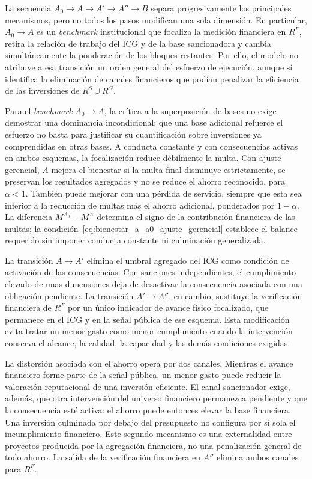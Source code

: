 La secuencia \(A_0\to A\to A'\to A''\to B\) separa progresivamente los principales mecanismos, pero no todos los pasos modifican una sola dimensión. En particular, \(A_0\to A\) es un \textit{benchmark} institucional que focaliza la medición financiera en \(R^{F}\), retira la relación de trabajo del ICG y de la base sancionadora y cambia simultáneamente la ponderación de los bloques restantes. Por ello, el modelo no atribuye a esa transición un orden general del esfuerzo de ejecución, aunque sí identifica la eliminación de canales financieros que podían penalizar la eficiencia de las inversiones de \(R^{S}\cup R^{G}\).

Para el \textit{benchmark} \(A_0\to A\), la crítica a la superposición de bases no exige demostrar una dominancia incondicional: que una base adicional refuerce el esfuerzo no basta para justificar su cuantificación sobre inversiones ya comprendidas en otras bases. A conducta constante y con consecuencias activas en ambos esquemas, la focalización reduce débilmente la multa. Con ajuste gerencial, \(A\) mejora el bienestar si la multa final disminuye estrictamente, se preservan los resultados agregados y no se reduce el ahorro reconocido, para \(\alpha<1\). También puede mejorar con una pérdida de servicio, siempre que esta sea inferior a la reducción de multas más el ahorro adicional, ponderados por \(1-\alpha\). La diferencia \(M^{A_0}-M^A\) determina el signo de la contribución financiera de las multas; la condición~\eqref{eq:bienestar_a_a0_ajuste_gerencial} establece el balance requerido sin imponer conducta constante ni culminación generalizada.

La transición \(A\to A'\) elimina el umbral agregado del ICG como condición de activación de las consecuencias. Con sanciones independientes, el cumplimiento elevado de unas dimensiones deja de desactivar la consecuencia asociada con una obligación pendiente. La transición \(A'\to A''\), en cambio, sustituye la verificación financiera de \(R^{F}\) por un único indicador de avance físico focalizado, que permanece en el ICG y en la señal pública de ese esquema. Esta modificación evita tratar un menor gasto como menor cumplimiento cuando la intervención conserva el alcance, la calidad, la capacidad y las demás condiciones exigidas.

La distorsión asociada con el ahorro opera por dos canales. Mientras el avance financiero forme parte de la señal pública, un menor gasto puede reducir la valoración reputacional de una inversión eficiente. El canal sancionador exige, además, que otra intervención del universo financiero permanezca pendiente y que la consecuencia esté activa: el ahorro puede entonces elevar la base financiera. Una inversión culminada por debajo del presupuesto no configura por sí sola el incumplimiento financiero. Este segundo mecanismo es una externalidad entre proyectos producida por la agregación financiera, no una penalización general de todo ahorro. La salida de la verificación financiera en \(A''\) elimina ambos canales para \(R^{F}\).

